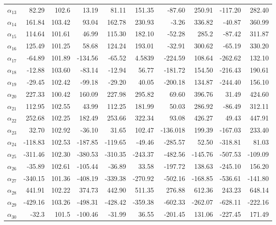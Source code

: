 \begin{table}[h!]
\begin{tabular}{l r r r r r r r r r}
		$\alpha_{13}$& 82.29 & 102.6  &	13.19   & 81.11   &	151.35  &-87.60   &	250.91 &-117.20 & 282.40 \\
		$\alpha_{14}$& 161.84& 103.42 &	93.04   & 162.78  & 230.93  &-3.26    & 336.82 &-40.87  & 360.99\\
		$\alpha_{15}$& 114.64& 101.61 &	46.99   & 115.30  &	182.10  &-52.28   & 285.2  &-87.42  & 311.87\\
		$\alpha_{16}$& 125.49& 101.25 & 58.68	& 124.24  & 193.01  &-32.91   &	300.62 &-65.19  & 330.20\\
		$\alpha_{17}$&-64.89 & 101.89 &-134.56  &-65.52   &	4.5839  &-224.59  &	108.64 &-262.62 & 132.10\\
		$\alpha_{18}$&-12.88 & 103.60 &-83.14   &-12.94   &	56.77	&-181.72  & 154.50 &-216.43 & 190.61\\
		$\alpha_{19}$&-29.45 & 102.42 &-99.18   &-29.20   &	40.05	&-200.18  &	134.87 &-244.40 &	156.10\\
		$\alpha_{20}$& 227.33& 100.42 &	160.09  & 227.98  & 295.82  & 69.60   &	396.76 & 31.49  &	424.60\\
		$\alpha_{21}$& 112.95& 102.55 &	43.99   & 112.25  &	181.99  & 50.03	  & 286.92 &-86.49  &	312.11 \\
		$\alpha_{22}$& 252.68& 102.25 & 182.49  & 253.66  &	322.34  & 93.08   &	426.27 & 49.43  & 447.91\\
		$\alpha_{23}$& 32.70 & 102.92 &-36.10   & 31.65   &	102.47	&-136.018 &	199.39 &-167.03 & 233.40\\
		$\alpha_{24}$&-118.83& 102.53 &-187.85  &-119.65  &-49.46 	&-285.57  &	52.50  &-318.81 & 81.03\\
		$\alpha_{25}$&-311.46& 102.30 &-380.53	&-310.35  &-243.37 	&-482.56  &-145.76 &-507.53 &-109.09\\
		$\alpha_{26}$&-35.89 & 102.61 &-105.44  &-36.89   & 33.58 	&-197.72  &	138.63 &-245.10 &	156.20\\
		$\alpha_{27}$&-340.15& 101.36 &-408.19  &-339.38  &	-270.92 &-502.16  &	-168.85&-536.61	&-141.80\\
		$\alpha_{28}$& 441.91& 102.22 &	374.73  & 442.90  &	511.35  & 276.88  & 612.36 & 243.23 &	648.14\\
		$\alpha_{29}$&-429.16& 103.26 &-498.31  &-428.42  &-359.38  &-602.33  & -262.07&-628.11 & -222.16\\
		$\alpha_{30}$&-32.3  & 101.5  &-100.46  &-31.99   &36.55    &-201.45  &	131.06 &-227.45 &	171.49\\
		
		\bottomrule
	\end{tabular}
\end{table} 





